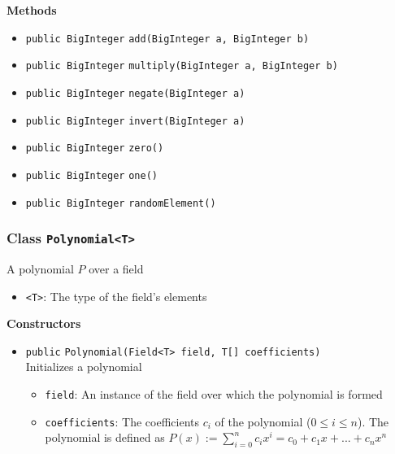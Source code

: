 \textbf{Methods}
\begin{itemize}
\item \lstinline|public BigInteger| \lstinline|add|\lstinline|(BigInteger a, BigInteger b)|




\item \lstinline|public BigInteger| \lstinline|multiply|\lstinline|(BigInteger a, BigInteger b)|




\item \lstinline|public BigInteger| \lstinline|negate|\lstinline|(BigInteger a)|




\item \lstinline|public BigInteger| \lstinline|invert|\lstinline|(BigInteger a)|




\item \lstinline|public BigInteger| \lstinline|zero|\lstinline|()|




\item \lstinline|public BigInteger| \lstinline|one|\lstinline|()|




\item \lstinline|public BigInteger| \lstinline|randomElement|\lstinline|()|




\end{itemize}

\subsubsection{Class \lstinline|Polynomial<T>|}
A polynomial $P$ over a field \\


\begin{itemize}
\item \lstinline|<T>|: The type of the field's elements
\end{itemize}


\textbf{Constructors}
\begin{itemize}
\item \lstinline|public| \lstinline|Polynomial|\lstinline|(Field<T> field, T[] coefficients)|\\
Initializes a polynomial
\begin{itemize}
\item \lstinline|field|: An instance of the field over which the polynomial is formed
\item \lstinline|coefficients|: The coefficients $c_i$ of the polynomial ($0 \leq i \leq n$).
 The polynomial is defined as $P(x) := \sum_{i=0}^n c_i x^i = c_0 + c_1
 x + ... + c_n x^n$
\end{itemize}



\end{itemize}


